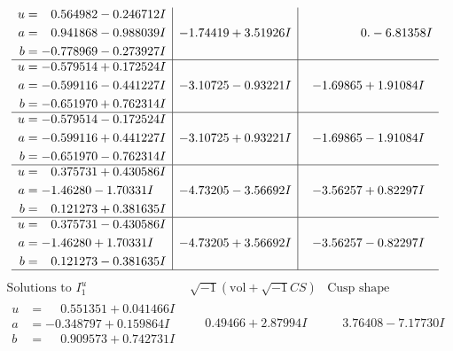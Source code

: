 \documentclass[1p]{elsarticle_modified}
\theoremstyle{definition}
\newcommand{\I}{\sqrt{-1}}
\begin{document}
$$\begin{array}{c|c|c}
\begin{aligned}
u &= \phantom{-}0.564982 - 0.246712 I \\
a &= \phantom{-}0.941868 - 0.988039 I \\
b &= -0.778969 - 0.273927 I\end{aligned}
 & -1.74419 + 3.51926 I & \phantom{-0.000000 } 0. - 6.81358 I \\ \hline\begin{aligned}
u &= -0.579514 + 0.172524 I \\
a &= -0.599116 - 0.441227 I \\
b &= -0.651970 + 0.762314 I\end{aligned}
 & -3.10725 - 0.93221 I & -1.69865 + 1.91084 I \\ \hline\begin{aligned}
u &= -0.579514 - 0.172524 I \\
a &= -0.599116 + 0.441227 I \\
b &= -0.651970 - 0.762314 I\end{aligned}
 & -3.10725 + 0.93221 I & -1.69865 - 1.91084 I \\ \hline\begin{aligned}
u &= \phantom{-}0.375731 + 0.430586 I \\
a &= -1.46280 - 1.70331 I \\
b &= \phantom{-}0.121273 + 0.381635 I\end{aligned}
 & -4.73205 - 3.56692 I & -3.56257 + 0.82297 I \\ \hline\begin{aligned}
u &= \phantom{-}0.375731 - 0.430586 I \\
a &= -1.46280 + 1.70331 I \\
b &= \phantom{-}0.121273 - 0.381635 I\end{aligned}
 & -4.73205 + 3.56692 I & -3.56257 - 0.82297 I\\
 \hline 
 \end{array}$$\newpage$$\begin{array}{c|c|c}  
\text{Solutions to }I^u_{1}& \I (\text{vol} + \sqrt{-1}CS) & \text{Cusp shape}\\
 \hline 
\begin{aligned}
u &= \phantom{-}0.551351 + 0.041466 I \\
a &= -0.348797 + 0.159864 I \\
b &= \phantom{-}0.909573 + 0.742731 I\end{aligned}
 & \phantom{-}0.49466 + 2.87994 I & \phantom{-}3.76408 - 7.17730 I \\ \hline\begin{aligned}

\end{aligned}
\end{array}$$
\end{document}
